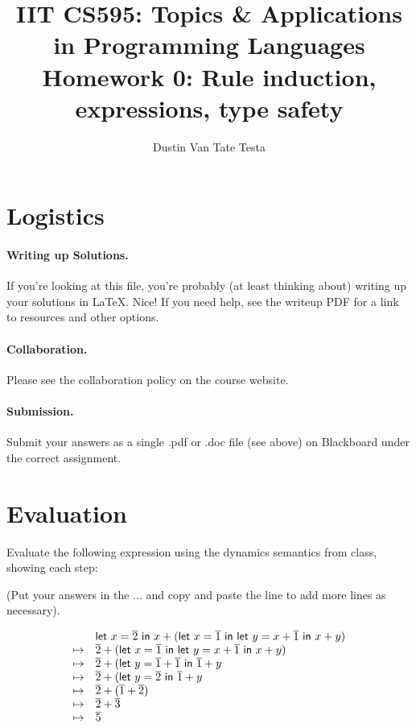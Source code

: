 \documentclass{article}
\title{IIT CS595: Topics \& Applications in Programming Languages\\
  {\large Homework 0: Rule induction, expressions, type safety}}
\author{Dustin Van Tate Testa}
\begin{document}
\maketitle

\section{Logistics}

\paragraph{Writing up Solutions.}
If you're looking at this file, you're probably (at least thinking about)
writing up your solutions in LaTeX. Nice! If you need help, see the writeup
PDF for a link to resources and other options.

\paragraph{Collaboration.}
Please see the collaboration policy on the course website.

\paragraph{Submission.}
Submit your answers as a single .pdf or .doc file (see above) on Blackboard
under
the correct assignment. 


\section{Evaluation}
\begin{task}
  Evaluate the following expression using the dynamics semantics from class,
  showing each step:

  (Put your answers in the ... and copy and paste the line to add more lines
  as necessary).
  
  \[
  \begin{array}{l l}
    &
    \mathsf{let}~x=\overline{2}~\mathsf{in}~x+(\mathsf{let}~x=\overline{1}~\mathsf{in}~\mathsf{let}~y=x+\overline{1}~\mathsf{in}~x+y)\\
    \mapsto & \overline{2}+(\mathsf{let}~x=\overline{1}~\mathsf{in}~\mathsf{let}~y=x+\overline{1}~\mathsf{in}~x+y)\\
    \mapsto & \overline{2}+(\mathsf{let}~y=\overline{1}+\overline{1}~\mathsf{in}~\overline{1}+y\\
    \mapsto & \overline{2}+(\mathsf{let}~y=\overline{2}~\mathsf{in}~\overline{1}+y\\
    \mapsto & \overline{2}+(\overline{1}+\overline{2})\\
    \mapsto & \overline{2}+\overline{3}\\
    \mapsto & \overline{5}\\
  \end{array}
  \]
\end{task}
\end{document}

